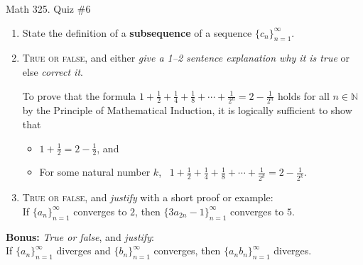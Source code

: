 \documentclass[12pt]{amsart}
\begin{document}
	
	\thispagestyle{empty}
	
	\begin{center}
		\Large{Math 325. Quiz \#6 }\\

	\end{center}
	
	
	
	\bigskip
	
	\begin{enumerate}
	
	\item State the definition of a \textbf{subsequence} of a sequence $\{c_n\}_{n=1}^{\infty}$. 
	
		
	\vfill\vfill
	
	\item \textsc{True or false}, and either \emph{give a 1--2 sentence explanation why it is true} or else \emph{correct it}.
	
	To prove that the formula $1 + \frac12 + \frac14 + \frac18 + \cdots + \frac{1}{2^{n}} = 2 -\frac{1}{2^{n}}$
	holds for all $n\in \mathbb{N}$ by the Principle of Mathematical Induction, it is logically sufficient to show that
	\begin{itemize}
	\item $1+\frac{1}{2} = 2 - \frac{1}{2}$, and
	\item For some natural number $k$, \ $1 + \frac12 + \frac14 + \frac18 + \cdots + \frac{1}{2^{k}} = 2 -\frac{1}{2^{k}}$.
	\end{itemize}
	

\vfill\vfill\vfill




	\item  \textsc{True or false}, and \emph{justify} with a short proof or example:\\
If $\{a_n\}_{n=1}^\infty$  converges to $2$, then $\{3 a_{2n} - 1\}_{n=1}^\infty$ converges to $5$.



\vfill\vfill\vfill 








\end{enumerate}

\newpage

\textbf{Bonus:} \emph{True or false}, and \emph{justify}:\\
If $\{a_n\}_{n=1}^\infty$ diverges and $\{b_n\}_{n=1}^\infty$ converges, then $\{a_n b_n\}_{n=1}^\infty$ diverges.
	
	
\end{document}
